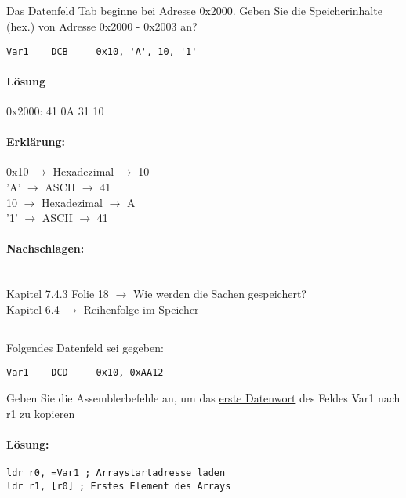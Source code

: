 \subsection{}
Das Datenfeld Tab beginne bei Adresse 0x2000. Geben Sie die Speicherinhalte (hex.) von Adresse 0x2000 - 0x2003 an?\\
\begin{lstlisting}
Var1 	DCB 	0x10, 'A', 10, '1'
\end{lstlisting}

\paragraph*{Lösung}
0x2000: 41 0A 31 10 \\


\paragraph*{Erklärung:}
0x10 $\rightarrow$ Hexadezimal $\rightarrow$ 10\\
'A' $\rightarrow$ ASCII $\rightarrow$ 41\\
10 $\rightarrow$ Hexadezimal $\rightarrow$ A\\
'1' $\rightarrow$ ASCII $\rightarrow$ 41\\

\paragraph*{Nachschlagen:}\\
Kapitel 7.4.3 Folie 18 $\rightarrow$ Wie werden die Sachen gespeichert?\\
Kapitel 6.4 $\rightarrow$ Reihenfolge im Speicher\\

\subsection{}
Folgendes Datenfeld sei gegeben:
\begin{lstlisting}
Var1 	DCD 	0x10, 0xAA12
\end{lstlisting}
Geben Sie die Assemblerbefehle an, um das \underline{erste Datenwort} des Feldes Var1 nach r1 zu kopieren

\paragraph*{Lösung:}
\begin{lstlisting}
ldr r0, =Var1 ; Arraystartadresse laden 
ldr r1, [r0] ; Erstes Element des Arrays
\end{lstlisting}
